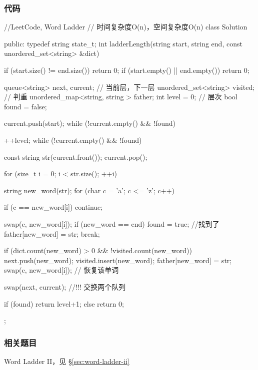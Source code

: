 \subsubsection{代码}
\begin{Code}
//LeetCode, Word Ladder
// 时间复杂度O(n)，空间复杂度O(n)
class Solution {
public:
    typedef string state_t;
    int ladderLength(string start, string end,
            const unordered_set<string> &dict) {
        if (start.size() != end.size()) return 0;
        if (start.empty() || end.empty()) return 0;

        queue<string> next, current; // 当前层，下一层
        unordered_set<string> visited; // 判重
        unordered_map<string, string > father;
        int level = 0;  // 层次
        bool found = false;

        current.push(start);
        while (!current.empty() && !found) {
            ++level;
            while (!current.empty() && !found) {
                const string str(current.front()); current.pop();

                for (size_t i = 0; i < str.size(); ++i) {
                    string new_word(str);
                    for (char c = 'a'; c <= 'z'; c++) {
                        if (c == new_word[i]) continue;

                        swap(c, new_word[i]);
                        if (new_word == end) {
                            found = true; //找到了
                            father[new_word] = str;
                            break;
                        }

                        if (dict.count(new_word) > 0
                                && !visited.count(new_word)) {
                            next.push(new_word);
                            visited.insert(new_word);
                            father[new_word] = str;
                        }
                        swap(c, new_word[i]); // 恢复该单词
                    }
                }
            }
            swap(next, current); //!!! 交换两个队列
        }
        if (found) return level+1;
        else return 0;
    }
};
\end{Code}


\subsubsection{相关题目}

\begindot
\item Word Ladder II，见 \S \ref{sec:word-ladder-ii}
\myenddot


